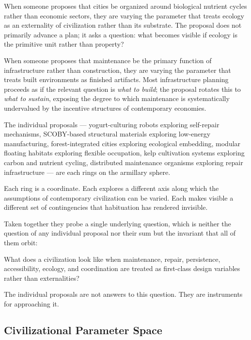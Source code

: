 \documentclass[12pt, a4paper]{article}
\theoremstyle{named}
\begin{document}
When someone proposes that cities be organized around biological nutrient
cycles rather than economic sectors, they are varying the parameter that
treats ecology as an externality of civilization rather than its
substrate. The proposal does not primarily advance a plan; it asks a
question: what becomes visible if ecology is the primitive unit rather
than property?

When someone proposes that maintenance be the primary function of
infrastructure rather than construction, they are varying the parameter
that treats built environments as finished artifacts. Most infrastructure
planning proceeds as if the relevant question is \emph{what to build};
the proposal rotates this to \emph{what to sustain}, exposing the
degree to which maintenance is systematically undervalued by the
incentive structures of contemporary economies.

The individual proposals — yogurt-culturing robots exploring self-repair
mechanisms, SCOBY-based structural materials exploring low-energy
manufacturing, forest-integrated cities exploring ecological embedding,
modular floating habitats exploring flexible occupation, kelp cultivation
systems exploring carbon and nutrient cycling, distributed maintenance
organisms exploring repair infrastructure — are each rings on the
armillary sphere.

Each ring is a coordinate. Each explores a different axis along which
the assumptions of contemporary civilization can be varied. Each makes
visible a different set of contingencies that habituation has rendered
invisible.

Taken together they probe a single underlying question, which is neither
the question of any individual proposal nor their sum but the invariant
that all of them orbit:

\begin{keybox}
What does a civilization look like when maintenance, repair, persistence,
accessibility, ecology, and coordination are treated as first-class
design variables rather than externalities?
\end{keybox}

The individual proposals are not answers to this question. They are
instruments for approaching it.

\subsection{Civilizational Parameter Space}
\end{document}
